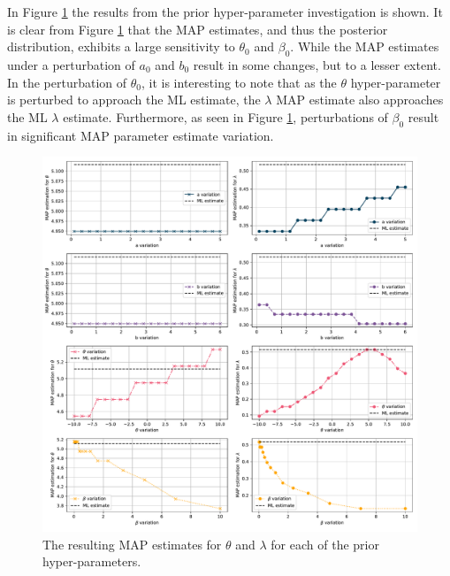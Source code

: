 \documentclass{article}
\begin{document}
In Figure \ref{fig:Q1b_param_invest} the results from the prior hyper-parameter investigation is shown. It is clear from Figure \ref{fig:Q1b_param_invest} that the MAP estimates, and thus the posterior distribution, exhibits a large sensitivity to $\theta_0$ and $\beta_0$. While the MAP estimates under a perturbation of $a_0$ and $b_0$ result in some changes, but to a lesser extent. In the perturbation of $\theta_0$, it is interesting to note that as the $\theta$ hyper-parameter is perturbed to approach the ML estimate, the $\lambda$ MAP estimate also approaches the ML $\lambda$ estimate. Furthermore, as seen in Figure \ref{fig:Q1b_param_invest}, perturbations of $\beta_0$ result in significant MAP parameter estimate variation.
\begin{figure}[htb!]
\centering
\includegraphics[scale=0.5]{Q1b_5.pdf}
\caption{The resulting MAP estimates for $\theta$ and $\lambda$ for each of the prior hyper-parameters.}
\label{fig:Q1b_param_invest}
\end{figure}
\end{document}
